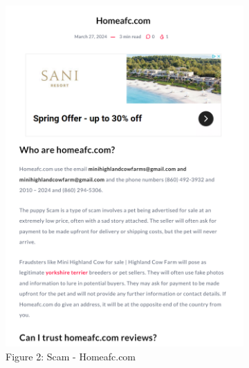 \documentclass[ oneside,%
                    author={Cassie Qing Tang},
                    degree={BSc},
                     title={An Automated Response System for Disrupting Online Pet Scamming \\ },
                    subtitle={ }]{dissertation}
\begin{document}
\begin{figure}[!htb]\ContinuedFloat
    \centering
    \begin{subfigure}[b]{0.45\textwidth}
        \includegraphics[width=\linewidth]{pic/figure2.png}
        \caption{Figure 2: Scam - Homeafc.com}
        \label{fig:sub2}
    \end{subfigure}
    \hfill %
    \begin{subfigure}[b]{0.45\textwidth}

\end{subfigure}
\end{figure}
\end{document}
